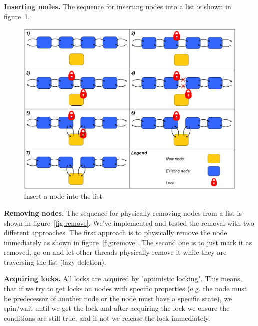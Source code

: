 \documentclass[letterpaper]{article}
\newcommand{\mypar}[1]{{\bf #1.}}
\begin{document}
\mypar{Inserting nodes}
The sequence for inserting nodes into a list is shown in figure~\ref{fig:insert}.

\begin{figure}[h]\centering
  \includegraphics[scale=0.31]{insert.eps}
  \caption{Insert a node into the list \label{fig:insert}}
\end{figure}

\mypar{Removing nodes}
The sequence for physically removing nodes from a list is shown in  figure~\ref{fig:remove}. We've implemented and tested the removal with two different approaches. The first approach is to physically remove the node immediately as shown in figure~\ref{fig:remove}. The second one is to just mark it as removed, go on and let other threads physically remove it while they are traversing the list (lazy deletion).

\mypar{Acquiring locks}
All locks are acquired by "optimistic locking". This means, that if we try to get locks on nodes with specific properties (e.g. the node must be predecessor of another node or the node must have a specific state), we spin/wait until we get the lock and after acquiring the lock we ensure the conditions are still true, and if not we release the lock immediately.
\end{document}
